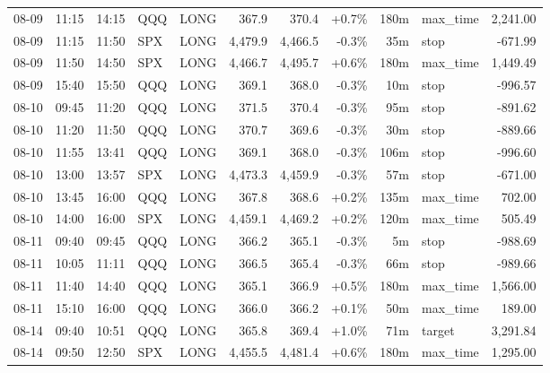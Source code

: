 \documentclass[11pt,a4paper,twoside]{article}
\begin{document}
\begin{center}
\begin{longtable}{>{\color{txtmain}}l l l l l r r r r >{\color{txtmain}}l r}
08-09 & 11:15 & 14:15 & QQQ & LONG & 367.9 & 370.4 & \textcolor{wingreen}{+0.7\%} & 180m & max\_time & \textcolor{wingreen}{2,241.00} \\
08-09 & 11:15 & 11:50 & SPX & LONG & 4,479.9 & 4,466.5 & \textcolor{lossred}{-0.3\%} & 35m & stop & \textcolor{lossred}{-671.99} \\
08-09 & 11:50 & 14:50 & SPX & LONG & 4,466.7 & 4,495.7 & \textcolor{wingreen}{+0.6\%} & 180m & max\_time & \textcolor{wingreen}{1,449.49} \\
08-09 & 15:40 & 15:50 & QQQ & LONG & 369.1 & 368.0 & \textcolor{lossred}{-0.3\%} & 10m & stop & \textcolor{lossred}{-996.57} \\
08-10 & 09:45 & 11:20 & QQQ & LONG & 371.5 & 370.4 & \textcolor{lossred}{-0.3\%} & 95m & stop & \textcolor{lossred}{-891.62} \\
08-10 & 11:20 & 11:50 & QQQ & LONG & 370.7 & 369.6 & \textcolor{lossred}{-0.3\%} & 30m & stop & \textcolor{lossred}{-889.66} \\
08-10 & 11:55 & 13:41 & QQQ & LONG & 369.1 & 368.0 & \textcolor{lossred}{-0.3\%} & 106m & stop & \textcolor{lossred}{-996.60} \\
08-10 & 13:00 & 13:57 & SPX & LONG & 4,473.3 & 4,459.9 & \textcolor{lossred}{-0.3\%} & 57m & stop & \textcolor{lossred}{-671.00} \\
08-10 & 13:45 & 16:00 & QQQ & LONG & 367.8 & 368.6 & \textcolor{wingreen}{+0.2\%} & 135m & max\_time & \textcolor{wingreen}{702.00} \\
08-10 & 14:00 & 16:00 & SPX & LONG & 4,459.1 & 4,469.2 & \textcolor{wingreen}{+0.2\%} & 120m & max\_time & \textcolor{wingreen}{505.49} \\
08-11 & 09:40 & 09:45 & QQQ & LONG & 366.2 & 365.1 & \textcolor{lossred}{-0.3\%} & 5m & stop & \textcolor{lossred}{-988.69} \\
08-11 & 10:05 & 11:11 & QQQ & LONG & 366.5 & 365.4 & \textcolor{lossred}{-0.3\%} & 66m & stop & \textcolor{lossred}{-989.66} \\
08-11 & 11:40 & 14:40 & QQQ & LONG & 365.1 & 366.9 & \textcolor{wingreen}{+0.5\%} & 180m & max\_time & \textcolor{wingreen}{1,566.00} \\
08-11 & 15:10 & 16:00 & QQQ & LONG & 366.0 & 366.2 & \textcolor{wingreen}{+0.1\%} & 50m & max\_time & \textcolor{wingreen}{189.00} \\
08-14 & 09:40 & 10:51 & QQQ & LONG & 365.8 & 369.4 & \textcolor{wingreen}{+1.0\%} & 71m & target & \textcolor{wingreen}{3,291.84} \\
08-14 & 09:50 & 12:50 & SPX & LONG & 4,455.5 & 4,481.4 & \textcolor{wingreen}{+0.6\%} & 180m & max\_time & \textcolor{wingreen}{1,295.00} \\

\end{longtable}
\end{center}
\end{document}
